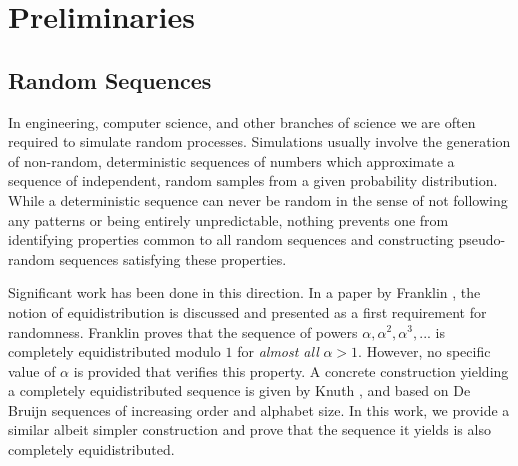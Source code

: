 \documentclass[11pt,a4paper]{tesis}
\theoremstyle{plain}
\theoremstyle{definition}
\begin{document}

\def\autor{Emilio Guido Almansi}
\def\tituloTesis{Secuencias completamente equidistribuidas basadas en secuencias de De Bruijn}
\def\runtitulo{Secuencias completamente equidistribuidas basadas en secuencias de De Bruijn}
\def\runtitle{Completely Equidistributed Sequences \\ Based on De Bruijn Sequences}
\def\director{Verónica Becher}
\def\lugar{Buenos Aires, 2019}




\frontmatter
\pagestyle{empty}


\cleardoublepage




\cleardoublepage
\tableofcontents

\mainmatter
\pagestyle{headings}

\chapter{Preliminaries}\label{chapter:preliminaries}

\section{Random Sequences}

In engineering, computer science, and other branches of science we are often required to simulate random processes. Simulations usually involve the generation of non-random, deterministic sequences of numbers which approximate a sequence of independent, random samples from a given probability distribution. While a deterministic sequence can never be random in the sense of not following any patterns or being entirely unpredictable, nothing prevents one from identifying properties common to all random sequences and constructing pseudo-random sequences satisfying these properties.

Significant work has been done in this direction. In a paper by Franklin \cite{franklin-1963}, the notion of equidistribution is discussed and presented as a first requirement for randomness. Franklin proves that the sequence of powers $\alpha, \alpha^2, \alpha^3, ...$ is completely equidistributed modulo $1$ for \textit{almost all} $\alpha > 1$. However, no specific value of $\alpha$ is provided that verifies this property. A concrete construction yielding a completely equidistributed sequence is given by Knuth \cite{knuth-1965}, and based on De Bruijn sequences of increasing order and alphabet size. In this work, we provide a similar albeit simpler construction and prove that the sequence it yields is also completely equidistributed.
\end{document}
